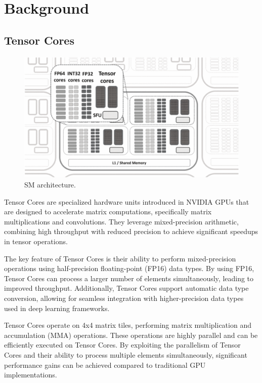 \documentclass[conference]{IEEEtran}
\begin{document}
  \section{Background}\label{sec:background}
  
  \subsection{Tensor Cores}\label{sec:tensor-cores}
  
  \begin{figure}[htbp]
    \centering
    \includegraphics[scale=0.32]{figures/SM.png}
    \caption{SM architecture.\cite{NVIDIA_Tensor_Core_Programmability_KTH}}
    \label{fig:performance-comparison}
  \end{figure}

  Tensor Cores are specialized hardware units introduced in NVIDIA GPUs that are designed to accelerate matrix computations, specifically matrix multiplications and convolutions. They leverage mixed-precision arithmetic, combining high throughput with reduced precision to achieve significant speedups in tensor operations.
  
  The key feature of Tensor Cores is their ability to perform mixed-precision operations using half-precision floating-point (FP16) data types. By using FP16, Tensor Cores can process a larger number of elements simultaneously, leading to improved throughput. Additionally, Tensor Cores support automatic data type conversion, allowing for seamless integration with higher-precision data types used in deep learning frameworks.
  
  Tensor Cores operate on 4x4 matrix tiles, performing matrix multiplication and accumulation (MMA) operations. These operations are highly parallel and can be efficiently executed on Tensor Cores. By exploiting the parallelism of Tensor Cores and their ability to process multiple elements simultaneously, significant performance gains can be achieved compared to traditional GPU implementations.
  
\end{document}
